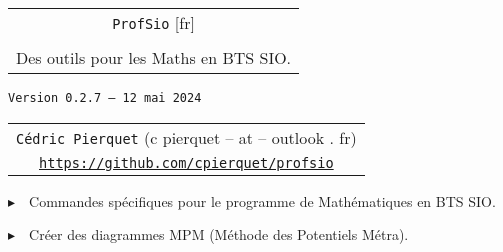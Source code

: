 \documentclass[french,a4paper,11pt]{article}
\def\TPversion{0.2.7}
\def\TPdate{12 mai 2024}
\begin{document}
\setlength{\aweboxleftmargin}{0.07\linewidth}
\setlength{\aweboxcontentwidth}{0.93\linewidth}
\setlength{\aweboxvskip}{8pt}

\pagestyle{fancy}

\thispagestyle{empty}

\vspace{2cm}

\begin{center}
	\begin{minipage}{0.75\linewidth}
	\begin{tcolorbox}[colframe=yellow,colback=yellow!15]
		\begin{center}
			\begin{tabular}{c}
				{\Huge \texttt{ProfSio} [fr]}\\
				\\
				{\LARGE Des outils pour les Maths en BTS SIO.} \\
			\end{tabular}
			
			\bigskip
			
			{\small \texttt{Version \TPversion{} -- \TPdate}}
		\end{center}
	\end{tcolorbox}
\end{minipage}
\end{center}

\begin{center}
	\begin{tabular}{c}
	\texttt{Cédric Pierquet} ({\ttfamily c pierquet -- at -- outlook . fr})\\
	\texttt{\url{https://github.com/cpierquet/profsio}}
\end{tabular}
\end{center}

\vspace{0.15cm}

{$\blacktriangleright$~~Commandes spécifiques pour le programme de Mathématiques en BTS SIO\footnotemark{}.}

\vspace{0.15cm}

{$\blacktriangleright$~~Créer des diagrammes MPM\footnotemark{} (Méthode des Potentiels Métra).}
\end{document}
